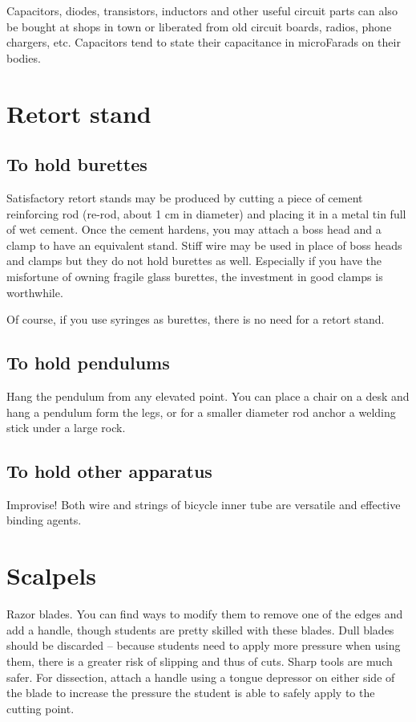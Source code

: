 Capacitors, 
diodes, 
transistors, 
inductors and other useful circuit parts can also be bought 
at shops in town or liberated from old circuit boards, 
radios, 
phone chargers, 
etc. 
Capacitors tend to state their capacitance in microFarads on their bodies.

\section{Retort stand}
\label{sec:retort-stand}

\subsection{To hold burettes}
Satisfactory retort stands may be produced 
by cutting a piece of cement reinforcing rod (re-rod, 
about 1 cm in diameter) and placing it in a metal tin full of wet cement. 
Once the cement hardens, 
you may attach a boss head and a clamp to have an equivalent stand. 
Stiff wire may be used in place of boss heads and clamps 
but they do not hold burettes as well. 
Especially if you have the misfortune of owning fragile glass burettes, 
the investment in good clamps is worthwhile.

Of course, 
if you use syringes as burettes, 
there is no need for a retort stand.

\subsection{To hold pendulums}
Hang the pendulum from any elevated point. 
You can place a chair on a desk and hang a pendulum form the legs, 
or for a smaller diameter rod anchor a welding stick under a large rock.

\subsection{To hold other apparatus}
Improvise! 
Both wire and strings of bicycle inner tube are versatile 
and effective binding agents.

\section{Scalpels}
\label{sec:scalpels}
Razor blades. 
You can find ways to modify them 
to remove one of the edges and add a handle, 
though students are pretty skilled with these blades. 
Dull blades should be discarded -- 
because students need to apply more pressure when using them, 
there is a greater risk of slipping and thus of cuts. 
Sharp tools are much safer. 
For dissection, 
attach a handle using a tongue depressor on either side of the blade 
to increase the pressure 
the student is able to safely apply to the cutting point.

